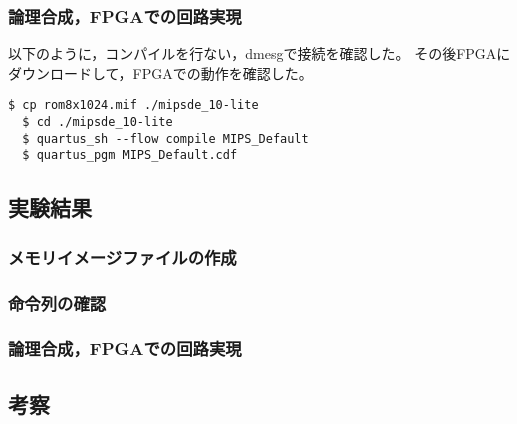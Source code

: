 \subsubsection{論理合成，FPGAでの回路実現}
以下のように，コンパイルを行ない，dmesgで接続を確認した。
その後FPGAにダウンロードして，FPGAでの動作を確認した。

\begin{lstlisting}[caption={コンパイル，ダウンロード},label={コンパイル，ダウンロード2-2}]
  $ cp rom8x1024.mif ./mipsde_10-lite
  $ cd ./mipsde_10-lite
  $ quartus_sh --flow compile MIPS_Default
  $ quartus_pgm MIPS_Default.cdf 
\end{lstlisting}

\subsection{実験結果}
\subsubsection{メモリイメージファイルの作成}

\subsubsection{命令列の確認}

\subsubsection{論理合成，FPGAでの回路実現}

\subsection{考察}
